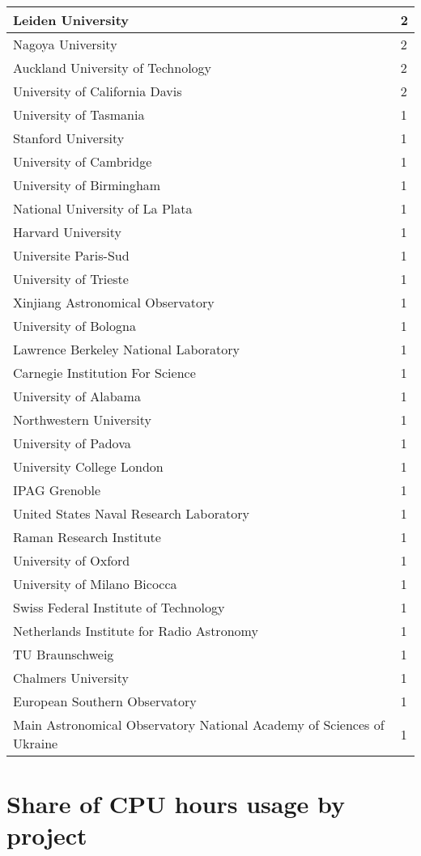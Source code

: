 \documentclass{article}%
\begin{document}
\begin{longtabu}{X[l] X[r]}
Leiden University&2\\%
\hline%
Nagoya University&2\\%
\hline%
Auckland University of Technology&2\\%
\hline%
University of California Davis&2\\%
\hline%
University of Tasmania&1\\%
\hline%
Stanford University&1\\%
\hline%
University of Cambridge&1\\%
\hline%
University of Birmingham&1\\%
\hline%
National University of La Plata&1\\%
\hline%
Harvard University&1\\%
\hline%
Universite Paris{-}Sud&1\\%
\hline%
University of Trieste&1\\%
\hline%
Xinjiang Astronomical Observatory&1\\%
\hline%
University of Bologna&1\\%
\hline%
Lawrence Berkeley National Laboratory&1\\%
\hline%
Carnegie Institution For Science&1\\%
\hline%
University of Alabama&1\\%
\hline%
Northwestern University&1\\%
\hline%
University of Padova&1\\%
\hline%
University College London&1\\%
\hline%
IPAG Grenoble&1\\%
\hline%
United States Naval Research Laboratory&1\\%
\hline%
Raman Research Institute&1\\%
\hline%
University of Oxford&1\\%
\hline%
University of Milano Bicocca&1\\%
\hline%
Swiss Federal Institute of Technology&1\\%
\hline%
Netherlands Institute for Radio Astronomy&1\\%
\hline%
TU Braunschweig&1\\%
\hline%
Chalmers University&1\\%
\hline%
European Southern Observatory&1\\%
\hline%
Main Astronomical Observatory National Academy of Sciences of Ukraine&1\\%
\hline%
\end{longtabu}%
\section{Share of CPU hours usage by project}%
\end{document}
